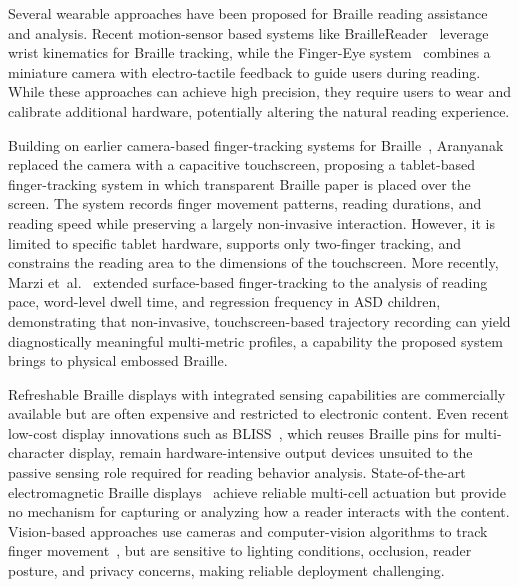 \documentclass[conference]{IEEEtran}
\begin{document}

    Several wearable approaches have been proposed for Braille reading
    assistance and analysis. Recent motion-sensor based systems like
    BrailleReader~\cite{liu2024braillereader} leverage wrist kinematics
    for Braille tracking, while the Finger-Eye system~\cite{b2} combines
    a miniature camera with electro-tactile feedback to guide users during
    reading. While these approaches can achieve high precision, they
    require users to wear and calibrate additional hardware, potentially
    altering the natural reading experience.


    Building on earlier camera-based finger-tracking systems for
    Braille~\cite{rassmuscamera2006},  Aranyanak~\cite{b4} replaced
    the camera with a capacitive touchscreen, proposing a tablet-based
    finger-tracking system in which transparent Braille paper is placed
    over the screen. The system records finger movement patterns, reading
    durations, and reading speed while preserving a largely non-invasive
    interaction. However, it is limited to specific tablet hardware,
    supports only two-finger tracking, and constrains the reading area to
    the dimensions of the touchscreen. More recently, Marzi
    et~al.~\cite{marzi2022} extended surface-based finger-tracking to the
    analysis of reading pace, word-level dwell time, and regression
    frequency in ASD children, demonstrating that non-invasive,
    touchscreen-based trajectory recording can yield diagnostically
    meaningful multi-metric profiles, a capability the proposed system
    brings to physical embossed Braille.


    Refreshable Braille displays with integrated sensing capabilities are
    commercially available but are often expensive and restricted to
    electronic content. Even recent low-cost display innovations
    such as BLISS~\cite{etezad2024}, which reuses Braille pins for
    multi-character display, remain hardware-intensive output devices
    unsuited to the passive sensing role required for reading behavior
    analysis. State-of-the-art electromagnetic Braille
    displays~\cite{chen2023} achieve reliable multi-cell actuation but
    provide no mechanism for capturing or analyzing how a reader interacts
    with the content. Vision-based approaches use cameras and
    computer-vision algorithms to track finger movement~\cite{rassmuscamera2006}, but are
    sensitive to lighting conditions, occlusion, reader posture, and
    privacy concerns, making reliable deployment challenging.
\end{document}
